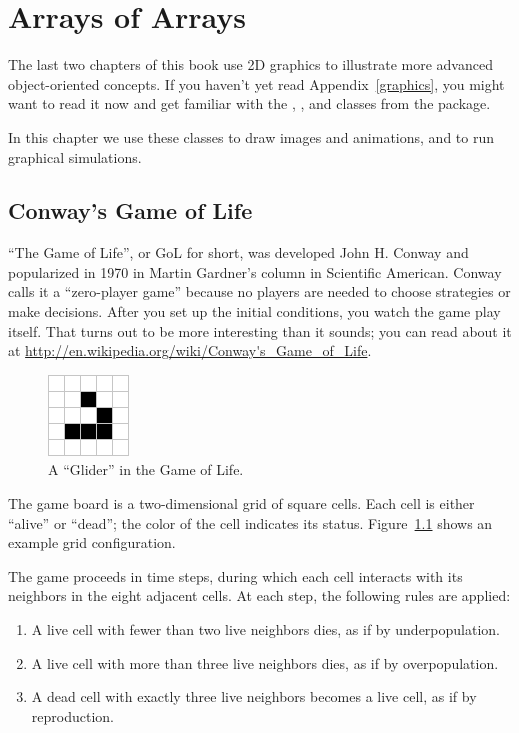 \chapter{Arrays of Arrays}
\label{conway}

The last two chapters of this book use 2D graphics to illustrate more advanced object-oriented concepts.
If you haven't yet read Appendix~\ref{graphics}, you might want to read it now and get familiar with the , , and  classes from the  package.

In this chapter we use these classes to draw images and animations, and to run graphical simulations.


\section{Conway's Game of Life}

``The Game of Life'', or GoL for short, was developed John H. Conway and popularized in 1970 in Martin Gardner’s column in Scientific American.
Conway calls it a ``zero-player game'' because no players are needed to choose strategies or make decisions.
After you set up the initial conditions, you watch the game play itself.
That turns out to be more interesting than it sounds; you can read about it at \url{http://en.wikipedia.org/wiki/Conway's_Game_of_Life}.

\begin{figure}[!ht]
\begin{center}
\includegraphics{figs/glider.png}
\caption{A ``Glider'' in the Game of Life.}
\label{fig:glider}
\end{center}
\end{figure}

The game board is a two-dimensional grid of square cells.
Each cell is either ``alive'' or ``dead''; the color of the cell indicates its status.
Figure~\ref{fig:glider} shows an example grid configuration.


The game proceeds in time steps, during which each cell interacts with its neighbors in the eight adjacent cells.
At each step, the following rules are applied:

\begin{enumerate}
\item A live cell with fewer than two live neighbors dies, as if by underpopulation.
\item A live cell with more than three live neighbors dies, as if by overpopulation.
\item A dead cell with exactly three live neighbors becomes a live cell, as if by reproduction.
\end{enumerate}

